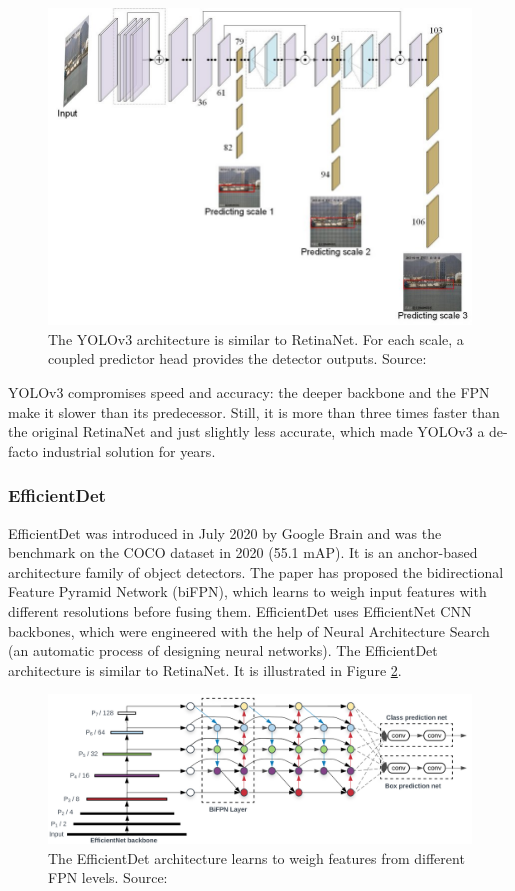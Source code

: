 \begin{figure}[htb]
 \centerline{\includegraphics[width=0.8\columnwidth]{.//Figure/Detector/YOLOv3.png}}
 \caption{The YOLOv3 architecture is similar to RetinaNet. For each scale, a coupled predictor head provides the detector outputs. Source: \cite{DeepLearningShipDetection}}
 \label{fig:YOLOv3}
\end{figure}

YOLOv3 compromises speed and accuracy: the deeper backbone and the FPN make it slower than its predecessor. Still, it is more than three times faster than the original RetinaNet and just slightly less accurate, which made YOLOv3 a de-facto industrial solution for years.

\subsubsection{EfficientDet}

EfficientDet\cite{EfficientDet} was introduced in July 2020 by Google Brain and was the benchmark on the COCO dataset in 2020 (55.1 mAP). It is an anchor-based architecture family of object detectors. The paper has proposed the bidirectional Feature Pyramid Network (biFPN), which learns to weigh input features with different resolutions before fusing them. EfficientDet uses EfficientNet CNN backbones, which were engineered with the help of Neural Architecture Search (an automatic process of designing neural networks). The EfficientDet architecture is similar to RetinaNet. It is illustrated in Figure \ref{fig:EfficientDet}.

\begin{figure}[H]
 \centerline{\includegraphics[width=1.0\columnwidth]{.//Figure/Detector/EfficientDet.png}}
 \caption{The EfficientDet architecture learns to weigh features from different FPN levels. Source: \cite{EfficientDet}}
 \label{fig:EfficientDet}
\end{figure}

